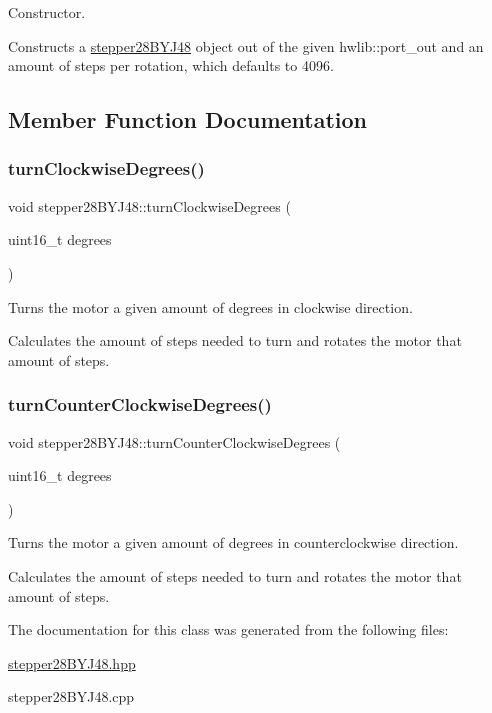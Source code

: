 Constructor. 

Constructs a \hyperlink{classstepper28BYJ48}{stepper28\+B\+Y\+J48} object out of the given hwlib\+::port\+\_\+out and an amount of steps per rotation, which defaults to 4096. 

\subsection{Member Function Documentation}
\mbox{\label{classstepper28BYJ48_af3033cdae6ad2f3670053759d13f809f}} 
\subsubsection{\texorpdfstring{turn\+Clockwise\+Degrees()}{turnClockwiseDegrees()}}
{\footnotesize\ttfamily void stepper28\+B\+Y\+J48\+::turn\+Clockwise\+Degrees (\begin{DoxyParamCaption}\item[{uint16\+\_\+t}]{degrees }\end{DoxyParamCaption})}



Turns the motor a given amount of degrees in clockwise direction. 

Calculates the amount of steps needed to turn and rotates the motor that amount of steps. \mbox{\label{classstepper28BYJ48_a074bc8527a623e0894f2ef8674d83bf0}} 
\subsubsection{\texorpdfstring{turn\+Counter\+Clockwise\+Degrees()}{turnCounterClockwiseDegrees()}}
{\footnotesize\ttfamily void stepper28\+B\+Y\+J48\+::turn\+Counter\+Clockwise\+Degrees (\begin{DoxyParamCaption}\item[{uint16\+\_\+t}]{degrees }\end{DoxyParamCaption})}



Turns the motor a given amount of degrees in counterclockwise direction. 

Calculates the amount of steps needed to turn and rotates the motor that amount of steps. 

The documentation for this class was generated from the following files\+:\begin{DoxyCompactItemize}
\item 
\hyperlink{stepper28BYJ48_8hpp}{stepper28\+B\+Y\+J48.\+hpp}\item 
stepper28\+B\+Y\+J48.\+cpp\end{DoxyCompactItemize}
